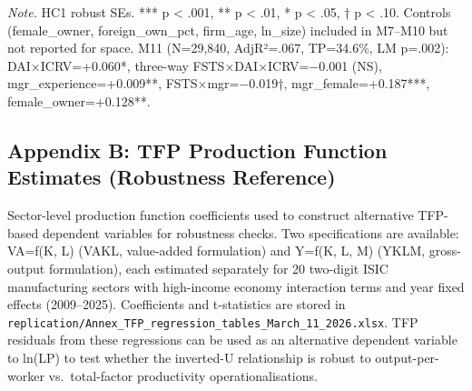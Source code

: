 \documentclass[
  12pt,a4paper]{article}
\begin{document}
\emph{Note.} HC1 robust SEs. *** p \textless{} .001, ** p \textless{}
.01, * p \textless{} .05, † p \textless{} .10. Controls (female\_owner,
foreign\_own\_pct, firm\_age, ln\_size) included in M7--M10 but not
reported for space. M11 (N=29,840, AdjR²=.067, TP=34.6\%, LM p=.002):
DAI×ICRV=+0.060*, three-way FSTS×DAI×ICRV=−0.001 (NS),
mgr\_experience=+0.009**, FSTS×mgr=−0.019†, mgr\_female=+0.187***,
female\_owner=+0.128**.

\hypertarget{appendix-b-tfp-production-function-estimates-robustness-reference}{%
\subsection{Appendix B: TFP Production Function Estimates (Robustness
Reference)}\label{appendix-b-tfp-production-function-estimates-robustness-reference}}

Sector-level production function coefficients used to construct
alternative TFP-based dependent variables for robustness checks. Two
specifications are available: VA=f(K, L) (VAKL, value-added formulation)
and Y=f(K, L, M) (YKLM, gross-output formulation), each estimated
separately for 20 two-digit ISIC manufacturing sectors with high-income
economy interaction terms and year fixed effects (2009--2025).
Coefficients and t-statistics are stored in
\texttt{replication/Annex\_TFP\_regression\_tables\_March\_11\_2026.xlsx}.
TFP residuals from these regressions can be used as an alternative
dependent variable to ln(LP) to test whether the inverted-U relationship
is robust to output-per-worker vs.~total-factor productivity
operationalisations.
\end{document}
